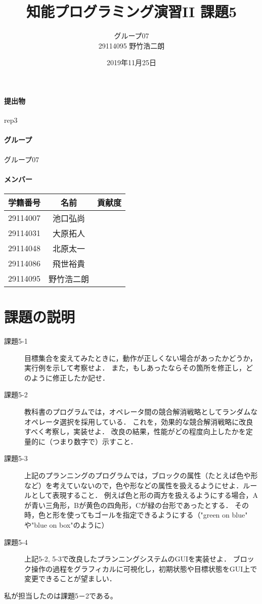\documentclass[a4j]{jarticle}
\title{知能プログラミング演習II 課題5}
\author{グループ07\\
  29114095 野竹浩二朗\\
}
\date{2019年11月25日}
\begin{document}
\maketitle

\paragraph{提出物} rep3
\paragraph{グループ} グループ07
\paragraph{メンバー}
\begin{tabular}{|c|c|c|}
  \hline\hline
  学籍番号&名前&貢献度\\
  \hline\hline
  29114007&池口弘尚&\\
  \hline
  29114031&大原拓人&\\
  \hline
  29114048&北原太一&\\
  \hline
  29114086&飛世裕貴&\\
  \hline
  29114095&野竹浩二朗&\\
  \hline
\end{tabular}



\section{課題の説明}
\begin{description}
\item[課題5-1] 目標集合を変えてみたときに，動作が正しくない場合があったかどうか，実行例を示して考察せよ．
また，もしあったならその箇所を修正し，どのように修正したか記せ．

\item[課題5-2] 教科書のプログラムでは，オペレータ間の競合解消戦略としてランダムなオペレータ選択を採用している．
これを，効果的な競合解消戦略に改良すべく考察し，実装せよ．
改良の結果，性能がどの程度向上したかを定量的に（つまり数字で）示すこと．

\item[課題5-3] 上記のプランニングのプログラムでは，ブロックの属性（たとえば色や形など）を考えていないので，色や形などの属性を扱えるようにせよ．ルールとして表現すること．
例えば色と形の両方を扱えるようにする場合，Aが青い三角形，Bが黄色の四角形，Cが緑の台形であったとする．
その時，色と形を使ってもゴールを指定できるようにする（"green on blue" や"blue on box"のように）

\item[課題5-4]上記5-2, 5-3で改良したプランニングシステムのGUIを実装せよ．
ブロック操作の過程をグラフィカルに可視化し，初期状態や目標状態をGUI上で変更できることが望ましい．

\end{description}
私が担当したのは課題5－2である。
\end{document}
